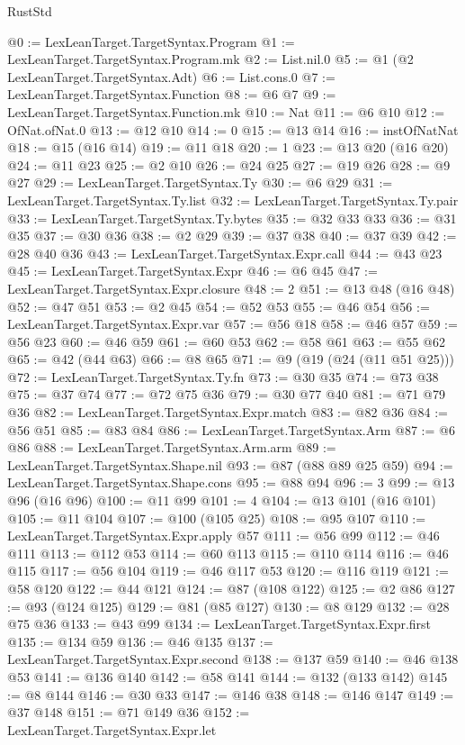 \begin{lexlean}{RustStd}
\begin{coremodule}
@0 := LexLeanTarget.TargetSyntax.Program
@1 := LexLeanTarget.TargetSyntax.Program.mk
@2 := List.nil.{0}
@5 := @1 (@2 LexLeanTarget.TargetSyntax.Adt)
@6 := List.cons.{0}
@7 := LexLeanTarget.TargetSyntax.Function
@8 := @6 @7
@9 := LexLeanTarget.TargetSyntax.Function.mk
@10 := Nat
@11 := @6 @10
@12 := OfNat.ofNat.{0}
@13 := @12 @10
@14 := 0
@15 := @13 @14
@16 := instOfNatNat
@18 := @15 (@16 @14)
@19 := @11 @18
@20 := 1
@23 := @13 @20 (@16 @20)
@24 := @11 @23
@25 := @2 @10
@26 := @24 @25
@27 := @19 @26
@28 := @9 @27
@29 := LexLeanTarget.TargetSyntax.Ty
@30 := @6 @29
@31 := LexLeanTarget.TargetSyntax.Ty.list
@32 := LexLeanTarget.TargetSyntax.Ty.pair
@33 := LexLeanTarget.TargetSyntax.Ty.bytes
@35 := @32 @33 @33
@36 := @31 @35
@37 := @30 @36
@38 := @2 @29
@39 := @37 @38
@40 := @37 @39
@42 := @28 @40 @36
@43 := LexLeanTarget.TargetSyntax.Expr.call
@44 := @43 @23
@45 := LexLeanTarget.TargetSyntax.Expr
@46 := @6 @45
@47 := LexLeanTarget.TargetSyntax.Expr.closure
@48 := 2
@51 := @13 @48 (@16 @48)
@52 := @47 @51
@53 := @2 @45
@54 := @52 @53
@55 := @46 @54
@56 := LexLeanTarget.TargetSyntax.Expr.var
@57 := @56 @18
@58 := @46 @57
@59 := @56 @23
@60 := @46 @59
@61 := @60 @53
@62 := @58 @61
@63 := @55 @62
@65 := @42 (@44 @63)
@66 := @8 @65
@71 := @9 (@19 (@24 (@11 @51 @25)))
@72 := LexLeanTarget.TargetSyntax.Ty.fn
@73 := @30 @35
@74 := @73 @38
@75 := @37 @74
@77 := @72 @75 @36
@79 := @30 @77 @40
@81 := @71 @79 @36
@82 := LexLeanTarget.TargetSyntax.Expr.match
@83 := @82 @36
@84 := @56 @51
@85 := @83 @84
@86 := LexLeanTarget.TargetSyntax.Arm
@87 := @6 @86
@88 := LexLeanTarget.TargetSyntax.Arm.arm
@89 := LexLeanTarget.TargetSyntax.Shape.nil
@93 := @87 (@88 @89 @25 @59)
@94 := LexLeanTarget.TargetSyntax.Shape.cons
@95 := @88 @94
@96 := 3
@99 := @13 @96 (@16 @96)
@100 := @11 @99
@101 := 4
@104 := @13 @101 (@16 @101)
@105 := @11 @104
@107 := @100 (@105 @25)
@108 := @95 @107
@110 := LexLeanTarget.TargetSyntax.Expr.apply @57
@111 := @56 @99
@112 := @46 @111
@113 := @112 @53
@114 := @60 @113
@115 := @110 @114
@116 := @46 @115
@117 := @56 @104
@119 := @46 @117 @53
@120 := @116 @119
@121 := @58 @120
@122 := @44 @121
@124 := @87 (@108 @122)
@125 := @2 @86
@127 := @93 (@124 @125)
@129 := @81 (@85 @127)
@130 := @8 @129
@132 := @28 @75 @36
@133 := @43 @99
@134 := LexLeanTarget.TargetSyntax.Expr.first
@135 := @134 @59
@136 := @46 @135
@137 := LexLeanTarget.TargetSyntax.Expr.second
@138 := @137 @59
@140 := @46 @138 @53
@141 := @136 @140
@142 := @58 @141
@144 := @132 (@133 @142)
@145 := @8 @144
@146 := @30 @33
@147 := @146 @38
@148 := @146 @147
@149 := @37 @148
@151 := @71 @149 @36
@152 := LexLeanTarget.TargetSyntax.Expr.let

\end{coremodule}
\end{lexlean}
